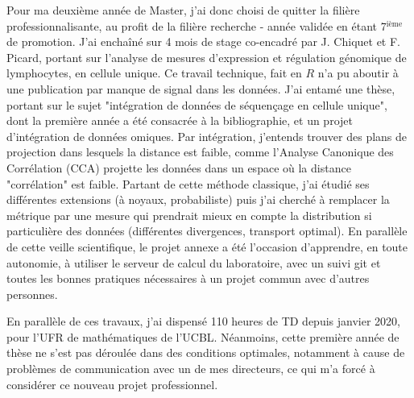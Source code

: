 \documentclass[a4paper,11pt]{article}
\begin{document}
Pour ma deuxième année de Master, j'ai donc choisi de quitter la filière professionnalisante, au profit de la filière recherche - année validée en étant 7$^{\text{ième}}$ de promotion. 
J'ai enchaîné sur 4 mois de stage co-encadré par J. Chiquet et F. Picard, portant sur l'analyse de mesures d'expression et régulation génomique de lymphocytes, en cellule unique. %
Ce travail technique, fait en $R$ n'a pu aboutir à une publication %
par manque de signal dans les données.
%
%
J'ai entamé une thèse, portant sur le sujet "intégration de données de séquençage en cellule unique", dont la première année a été consacrée à la bibliographie, et un projet d'intégration de données omiques. 
%
Par intégration, j'entends trouver des plans de projection dans lesquels la distance est faible, comme l'Analyse Canonique des Corrélation (CCA) projette les données dans un espace où la distance "corrélation" est faible. Partant de cette méthode classique, j'ai étudié ses différentes extensions (à noyaux, probabiliste) puis j'ai cherché à remplacer la métrique par une mesure qui prendrait mieux en compte la distribution si particulière des données (différentes divergences, transport optimal). 
En parallèle de cette veille scientifique, le projet annexe a été l'occasion d'apprendre, en toute autonomie, à utiliser le serveur de calcul du laboratoire, avec un suivi git et toutes les bonnes pratiques nécessaires à un projet commun avec d'autres personnes.
%
%

En parallèle de ces travaux, j'ai dispensé 110 heures de TD depuis janvier 2020, pour l'UFR de mathématiques de l'UCBL. 
Néanmoins, cette première année de thèse ne s'est pas déroulée dans des conditions optimales, notamment à cause de problèmes de communication avec un de mes directeurs, ce qui m'a forcé à considérer ce nouveau projet professionnel.\\ 
%
\end{document}
